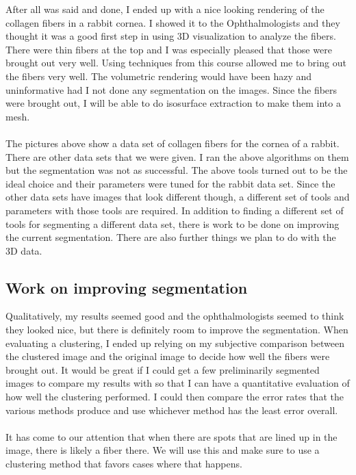\documentclass[11pt,psfig]{article}
\begin{document}
After all was said and done, I ended up with a nice looking rendering of the collagen fibers in a rabbit cornea. I showed it to the Ophthalmologists and they thought it was a good first step in using 3D visualization to analyze the fibers. There were thin fibers at the top and I was especially pleased that those were brought out very well. Using techniques from this course allowed me to bring out the fibers very well. The volumetric rendering would have been hazy and uninformative had I not done any segmentation on the images. Since the fibers were brought out, I will be able to do isosurface extraction to make them into a mesh. \\
\\
The pictures above show a data set of collagen fibers for the cornea of a rabbit. There are other data sets that we were given. I ran the above algorithms on them but the segmentation was not as successful. The above tools turned out to be the ideal choice and their parameters were tuned for the rabbit data set. Since the other data sets have images that look different though, a different set of tools and parameters with those tools are required. In addition to finding a different set of tools for segmenting a different data set, there is work to be done on improving the current segmentation. There are also further things we plan to do with the 3D data. 

\subsection{Work on improving segmentation}

Qualitatively, my results seemed good and the ophthalmologists seemed to think they looked nice, but there is definitely room to improve the segmentation. When evaluating a clustering, I ended up relying on my subjective comparison between the clustered image and the original image to decide how well the fibers were brought out. It would be great if I could get a few preliminarily segmented images to compare my results with so that I can have a quantitative evaluation of how well the clustering performed. I could then compare the error rates that the various methods produce and use whichever method has the least error overall. \\
\\
It has come to our attention that when there are spots that are lined up in the image, there is likely a fiber there. We will use this and make sure to use a clustering method that favors cases where that happens. 
\\
\end{document}
